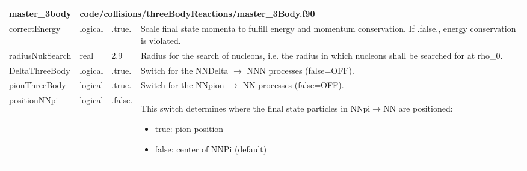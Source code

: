 \documentclass{article}
\begin{document}
\begin{longtable}{llll}
\toprule
\textbf{\large{master\_3body}} & \multicolumn{3}{l}{\footnotesize{code/collisions/threeBodyReactions/master\_3Body.f90}}\\*
\midrule
\endfirsthead
\midrule
\endhead
correctEnergy & \begin{minipage}[t]{2cm}logical\end{minipage} & \begin{minipage}[t]{2cm}.true.\end{minipage} & \begin{minipage}[t]{12cm}Scale final state momenta to fulfill energy and momentum conservation. If .false., energy conservation is violated.\end{minipage}\\*
\midrule
radiusNukSearch & \begin{minipage}[t]{2cm}real\end{minipage} & \begin{minipage}[t]{2cm}2.9\end{minipage} & \begin{minipage}[t]{12cm}Radius for the search of nucleons, i.e. the radius in which nucleons shall be searched for at rho\_0.\end{minipage}\\*
\midrule
DeltaThreeBody & \begin{minipage}[t]{2cm}logical\end{minipage} & \begin{minipage}[t]{2cm}.true.\end{minipage} & \begin{minipage}[t]{12cm}Switch for the NNDelta $\rightarrow$ NNN processes (false=OFF).\end{minipage}\\*
\midrule
pionThreeBody & \begin{minipage}[t]{2cm}logical\end{minipage} & \begin{minipage}[t]{2cm}.true.\end{minipage} & \begin{minipage}[t]{12cm}Switch for the NNpion $\rightarrow$ NN processes (false=OFF).\end{minipage}\\*
\midrule
positionNNpi & \begin{minipage}[t]{2cm}logical\end{minipage} & \begin{minipage}[t]{2cm}.false.\end{minipage} & \begin{minipage}[t]{12cm}This switch determines where the final state particles in NNpi$\rightarrow$NN are positioned:\begin{itemize}\leftmargin0em\itemindent0pt\item true: pion position\item false: center of NNPi (default)\end{itemize}\end{minipage}\\*

\end{longtable}
\end{document}
